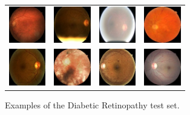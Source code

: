 \documentclass[journal]{IEEEtran}
\begin{document}
\begin{itemize}
		\begin{figure}[!t]
			\centering
			\begin{tabular}{cccc}
			\includegraphics[width=1.6cm]{img/retinopathy/1.jpg} & \includegraphics[width=1.6cm]{img/retinopathy/2.jpg} & \includegraphics[width=1.6cm]{img/retinopathy/3.jpg} & \includegraphics[width=1.6cm]{img/retinopathy/4.jpg}\\
			\includegraphics[width=1.6cm]{img/retinopathy/5.jpg} & \includegraphics[width=1.6cm]{img/retinopathy/6.jpg} & \includegraphics[width=1.6cm]{img/retinopathy/7.jpg} & \includegraphics[width=1.6cm]{img/retinopathy/8.jpg}
			\end{tabular}						
			\caption{Examples of the Diabetic Retinopathy test set.}
			\label{fig:DRexamples}
		\end{figure}
		

\end{itemize}
\end{document}
